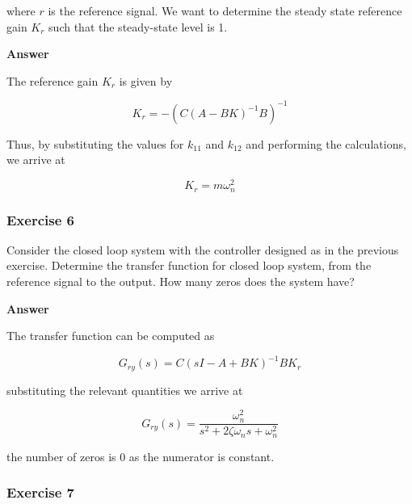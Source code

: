 where $r$ is the reference signal. We want to determine the steady state reference gain $K_r$ such that the steady-state level is 1.

\textbf{Answer}

The reference gain $K_r$ is given by 

\begin{equation}
K_r = - ( C(A-BK)^{-1}B)^{-1} 
\end{equation}

Thus, by substituting the values for $k_{11}$ and $k_{12}$ and performing the calculations, we arrive at 

\begin{equation}
K_r = m\omega_{n}^{2}
\end{equation}

\subsubsection{Exercise 6}

Consider the closed loop system with the controller designed as in the previous exercise. Determine the transfer function for closed loop system, from the reference signal to the output.  How many zeros does the system have?

\textbf{Answer}

The transfer function can be computed as

\begin{equation}
G_{ry}(s) = C(sI - A + BK)^{-1}BK_r \nonumber
\end{equation}

substituting the relevant quantities we arrive at

\begin{equation}
G_{ry}(s) = \frac{\omega_{n}^{2}}{s^2 + 2\zeta\omega_n s + \omega_{n}^{2}}  \nonumber
\end{equation}

the number of zeros is 0 as the numerator is constant.

\subsubsection{Exercise 7}

